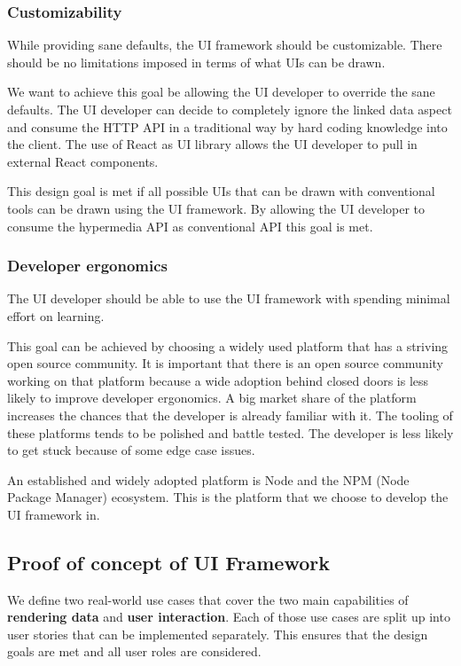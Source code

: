 \subsubsection{Customizability}
While providing sane defaults, the UI framework should be customizable. There should be no limitations imposed in terms of what UIs can be drawn.

We want to achieve this goal be allowing the UI developer to override the sane defaults. The UI developer can decide to completely ignore the linked data aspect and consume the HTTP API in a traditional way by hard coding knowledge into the client. The use of React as UI library allows the UI developer to pull in external React components.

This design goal is met if all possible UIs that can be drawn with conventional tools can be drawn using the UI framework. By allowing the UI developer to consume the hypermedia API as conventional API this goal is met.

\subsubsection{Developer ergonomics}
The UI developer should be able to use the UI framework with spending minimal effort on learning.

This goal can be achieved by choosing a widely used platform that has a striving open source community. It is important that there is an open source community working on that platform because a wide adoption behind closed doors is less likely to improve developer ergonomics.
A big market share of the platform increases the chances that the developer is already familiar with it. The tooling of these platforms tends to be polished and battle tested. The developer is less likely to get stuck because of some edge case issues.

An established and widely adopted platform is Node and the NPM (Node Package Manager) ecosystem. This is the platform that we choose to develop the UI framework in.

\subsection{Proof of concept of UI Framework}\label{proofofconcept}
We define two real-world use cases that cover the two main capabilities of \textbf{rendering data} and \textbf{user interaction}. Each of those use cases are split up into user stories that can be implemented separately. This ensures that the design goals are met and all user roles are considered.

